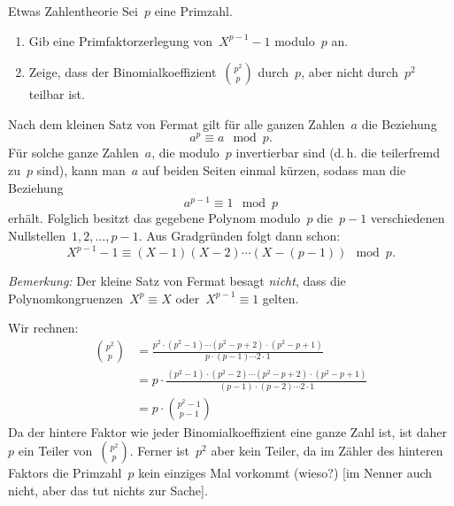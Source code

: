 \documentclass{algblatt}
\begin{document}
\begin{aufgabe}{Etwas Zahlentheorie}
Sei~$p$ eine Primzahl.
\begin{enumerate}
\item Gib eine Primfaktorzerlegung von~$X^{p-1}-1$
modulo~$p$ an.
\item Zeige, dass der Binomialkoeffizient~$\binom{p^2}{p}$ durch~$p$, aber
nicht durch~$p^2$ teilbar ist.
\end{enumerate}

\begin{loesungE}
\item Nach dem kleinen Satz von Fermat gilt für alle ganzen Zahlen~$a$ die
Beziehung
\[ a^p \equiv a \mod p. \]
Für solche ganze Zahlen~$a$, die modulo~$p$ invertierbar sind (d.\,h. die
teilerfremd zu~$p$ sind), kann man~$a$ auf beiden Seiten einmal kürzen, sodass
man die Beziehung
\[ a^{p-1} \equiv 1 \mod p \]
erhält. Folglich besitzt das gegebene Polynom modulo~$p$ die~$p-1$
verschiedenen Nullstellen~$1,2,\ldots,{p-1}$. Aus Gradgründen folgt dann schon:
\[ X^{p-1} - 1 \equiv (X-1) (X-2) \cdots (X-(p-1)) \mod p. \]

\emph{Bemerkung:} Der kleine Satz von Fermat besagt \emph{nicht}, dass die
Polynomkongruenzen~$X^p \equiv X$ oder~$X^{p-1} \equiv 1$ gelten.

\item Wir rechnen:
\begin{align*}
  \binom{p^2}{p} &=
  \frac{p^2 \cdot (p^2 - 1) \cdots (p^2 - p + 2) \cdot (p^2 - p + 1)}{p \cdot
  (p-1) \cdots 2 \cdot 1} \\[0.5em]
  &= p \cdot \frac{(p^2 - 1) \cdot (p^2-2) \cdots (p^2 - p + 2) \cdot (p^2 - p + 1)}{(p-1)
  \cdot (p-2) \cdots 2 \cdot 1} \\[0.5em]
  &= p \cdot \binom{p^2-1}{p-1}
\end{align*}
Da der hintere Faktor wie jeder Binomialkoeffizient eine ganze Zahl ist, ist
daher~$p$ ein Teiler von~$\binom{p^2}{p}$. Ferner ist~$p^2$ aber kein Teiler,
da im Zähler des hinteren Faktors die Primzahl~$p$ kein einziges Mal vorkommt
(wieso?) [im Nenner auch nicht, aber das tut nichts zur Sache].
\end{loesungE}
\end{aufgabe}
\end{document}
